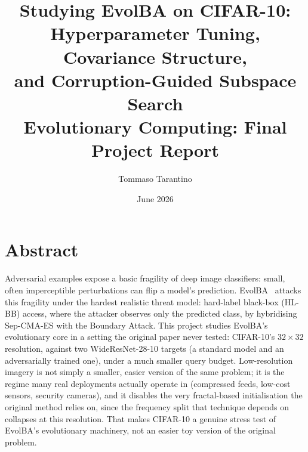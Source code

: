 \documentclass[11pt, a4paper]{article}
\title{%
  \textbf{Studying EvolBA on CIFAR-10:} \\[0.3em]
  \large Hyperparameter Tuning, Covariance Structure, \\
  and Corruption-Guided Subspace Search \\[0.2em]
  \normalsize Evolutionary Computing: Final Project Report
}
\author{Tommaso Tarantino}
\date{June 2026}
\begin{document}
\maketitle
\tableofcontents
\newpage

\section{Abstract}

Adversarial examples expose a basic fragility of deep image classifiers: small, often imperceptible perturbations can flip a model's prediction. EvolBA~\cite{evolba2024} attacks this fragility under the hardest realistic threat model: hard-label black-box (HL-BB) access, where the attacker observes only the predicted class, by hybridising Sep-CMA-ES with the Boundary Attack. This project studies EvolBA's evolutionary core in a setting the original paper never tested: CIFAR-10's $32\times32$ resolution, against two WideResNet-28-10 targets (a standard model and an adversarially trained one), under a much smaller query budget. Low-resolution imagery is not simply a smaller, easier version of the same problem; it is the regime many real deployments actually operate in (compressed feeds, low-cost sensors, security cameras), and it disables the very fractal-based initialisation the original method relies on, since the frequency split that technique depends on collapses at this resolution. That makes CIFAR-10 a genuine stress test of EvolBA's evolutionary machinery, not an easier toy version of the original problem.
\end{document}

